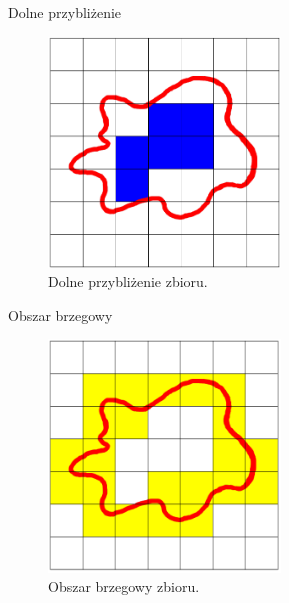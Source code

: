 \documentclass[10pt]{beamer}
\begin{document}
\begin{frame}{Dolne przybliżenie}
\begin{center}
\begin{figure}
\includegraphics[width=0.55\textwidth]{Grafiki/dolne_przyblizenie.png}
\caption{Dolne przybliżenie zbioru.}
\end{figure}

\end{center}
\end{frame}


\begin{frame}{Obszar brzegowy}
\begin{center}
\begin{figure}
\includegraphics[width=0.55\textwidth]{Grafiki/obszar_brzegowy.png}
\caption{Obszar brzegowy zbioru.}
\end{figure}

\end{center}
\end{frame}
\end{document}
